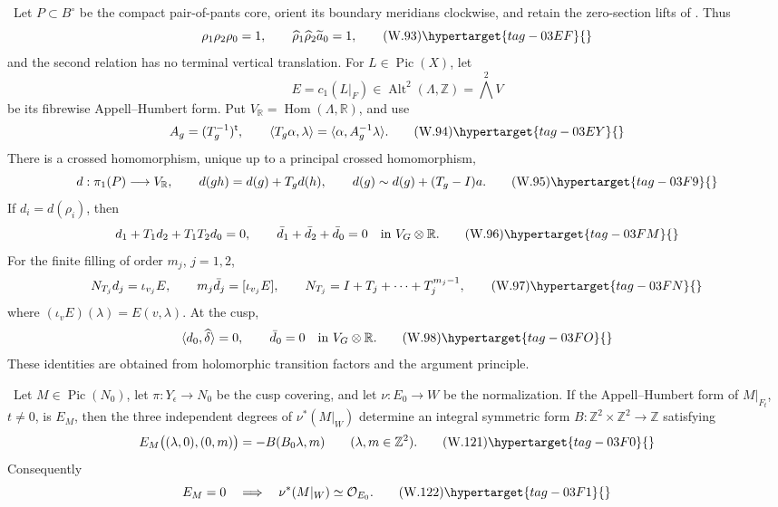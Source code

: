 \begin{proposition}
\hypertarget{tag-03IH}{}\label{wbII:prop:analytic-ah-boundary}


\ Let \(P\subset B^\circ\) be the compact pair-of-pants core,
orient its boundary meridians clockwise, and retain the zero-section lifts
of .  Thus
\[
 \rho_1\rho_2\rho_0=1,
 \qquad
 \widehat\rho_1\widehat\rho_2\widetilde a_0=1,
\tag{W.93}\hypertarget{tag-03EF}{}\label{wbII:eq:W:5.17-A1}
\]
and the second relation has no terminal vertical translation.  For
\(L\in\operatorname{Pic}(X)\), let
\[
 E=c_1(L|_F)\in\operatorname{Alt}^2(\Lambda,\mathbb Z)
   =\bigwedge^2V
\]
be its fibrewise Appell--Humbert form.  Put
\(V_{\mathbb R}=\operatorname{Hom}(\Lambda,\mathbb R)\), and use
\[
 A_g=(T_g^{-1})^{\mathsf t},
 \qquad
 \langle T_g\alpha,\lambda\rangle
 =\langle\alpha,A_g^{-1}\lambda\rangle.
\tag{W.94}\hypertarget{tag-03EY}{}\label{wbII:eq:W:5.17-A2}
\]
There is a crossed homomorphism, unique up to a principal crossed
homomorphism,
\[
 d:\pi_1(P)\longrightarrow V_{\mathbb R},
 \qquad
 d(gh)=d(g)+T_gd(h),
 \qquad
 d(g)\sim d(g)+(T_g-I)a.
\tag{W.95}\hypertarget{tag-03F9}{}\label{wbII:eq:W:5.17-A3}
\]
If \(d_i=d(\rho_i)\), then
\[
 d_1+T_1d_2+T_1T_2d_0=0,
 \qquad
 \bar d_1+\bar d_2+\bar d_0=0
 \quad\text{in }V_G\otimes\mathbb R.
\tag{W.96}\hypertarget{tag-03FM}{}\label{wbII:eq:W:5.17-A4}
\]
For the finite filling of order \(m_j\), \(j=1,2\),
\[
 N_{T_j}d_j=\iota_{v_j}E,
 \qquad
 m_j\bar d_j=[\iota_{v_j}E],
 \qquad
 N_{T_j}=I+T_j+\cdots+T_j^{m_j-1},
\tag{W.97}\hypertarget{tag-03FN}{}\label{wbII:eq:W:5.17-A5}
\]
where \((\iota_vE)(\lambda)=E(v,\lambda)\).  At the cusp,
\[
 \langle d_0,\widehat\delta\rangle=0,
 \qquad
 \bar d_0=0\quad\text{in }V_G\otimes\mathbb R.
\tag{W.98}\hypertarget{tag-03FO}{}\label{wbII:eq:W:5.17-A6}
\]
These identities are obtained from holomorphic transition factors and the
argument principle.
\end{proposition}

\begin{lemma}
\hypertarget{tag-03I6}{}\label{wbII:lem:analytic-support-specialization}


\ Let \(M\in\operatorname{Pic}(N_0)\), let
\(\pi:Y_\epsilon\to N_0\) be the cusp covering, and let
\(\nu:E_0\to W\) be the normalization.  If the Appell--Humbert form of
\(M|_{F_t}\), \(t\ne0\), is \(E_M\), then the three independent degrees
of \(\nu^*(M|_W)\) determine an integral symmetric form
\(B:\mathbb Z^2\times\mathbb Z^2\to\mathbb Z\) satisfying
\[
 E_M\bigl((\lambda,0),(0,m)\bigr)
 =-B(B_0\lambda,m)
 \qquad(\lambda,m\in\mathbb Z^2).
\tag{W.121}\hypertarget{tag-03F0}{}\label{wbII:eq:W:5.17-A21}
\]
Consequently
\[
 E_M=0
 \quad\Longrightarrow\quad
 \nu^*(M|_W)\simeq\mathcal O_{E_0}.
\tag{W.122}\hypertarget{tag-03F1}{}\label{wbII:eq:W:5.17-A22}
\]
\end{lemma}

